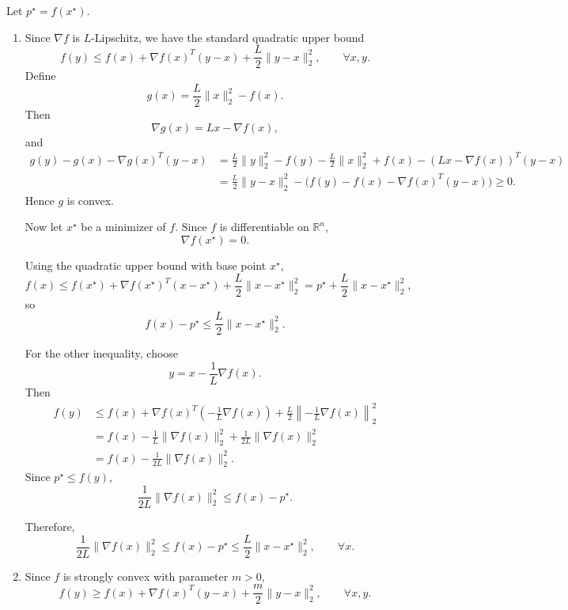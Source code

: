\documentclass[11pt,letter,notitlepage]{article}
\theoremstyle{definition}
\begin{document}
\newpage

\begin{solution}
Let $p^\star=f(x^\star)$.

\begin{enumerate}[label=(\alph*)]
    \item Since $\nabla f$ is $L$-Lipschitz, we have the standard quadratic upper bound
    \[
    f(y)\le f(x)+\nabla f(x)^T(y-x)+\frac{L}{2}\|y-x\|_2^2,
    \qquad \forall x,y.
    \]
    Define
    \[
    g(x)=\frac{L}{2}\|x\|_2^2-f(x).
    \]
    Then
    \[
    \nabla g(x)=Lx-\nabla f(x),
    \]
    and
    \[
    \begin{aligned}
    g(y)-g(x)-\nabla g(x)^T(y-x)
    &=\frac{L}{2}\|y\|_2^2-f(y)-\frac{L}{2}\|x\|_2^2+f(x)-(Lx-\nabla f(x))^T(y-x)\\
    &=\frac{L}{2}\|y-x\|_2^2-\Big(f(y)-f(x)-\nabla f(x)^T(y-x)\Big)\ge 0.
    \end{aligned}
    \]
    Hence $g$ is convex.

    Now let $x^\star$ be a minimizer of $f$. Since $f$ is differentiable on $\mathbb R^n$,
    \[
    \nabla f(x^\star)=0.
    \]

    Using the quadratic upper bound with base point $x^\star$,
    \[
    f(x)\le f(x^\star)+\nabla f(x^\star)^T(x-x^\star)+\frac{L}{2}\|x-x^\star\|_2^2
    =p^\star+\frac{L}{2}\|x-x^\star\|_2^2,
    \]
    so
    \[
    f(x)-p^\star\le \frac{L}{2}\|x-x^\star\|_2^2.
    \]

    For the other inequality, choose
    \[
    y=x-\frac1L\nabla f(x).
    \]
    Then
    \[
    \begin{aligned}
    f(y)
    &\le f(x)+\nabla f(x)^T\left(-\frac1L\nabla f(x)\right)
    +\frac{L}{2}\left\|-\frac1L\nabla f(x)\right\|_2^2\\
    &=f(x)-\frac1L\|\nabla f(x)\|_2^2+\frac1{2L}\|\nabla f(x)\|_2^2\\
    &=f(x)-\frac1{2L}\|\nabla f(x)\|_2^2.
    \end{aligned}
    \]
    Since $p^\star\le f(y)$,
    \[
    \frac1{2L}\|\nabla f(x)\|_2^2\le f(x)-p^\star.
    \]

    Therefore,
    \[
    \frac{1}{2L}\|\nabla f(x)\|_2^2 \le f(x)-p^\star \le \frac{L}{2}\|x-x^\star\|_2^2,
    \qquad \forall x.
    \]

    \item Since $f$ is strongly convex with parameter $m>0$,
    \[
    f(y)\ge f(x)+\nabla f(x)^T(y-x)+\frac{m}{2}\|y-x\|_2^2,
    \qquad \forall x,y.
    \]


\end{enumerate}
\end{solution}
\end{document}
